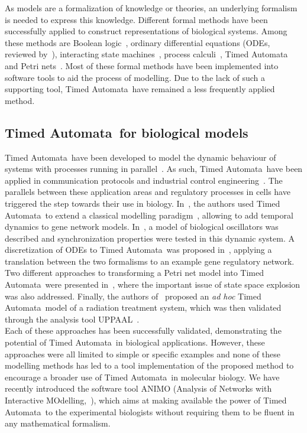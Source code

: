 \documentclass{bmcart}
\def\tas{Timed Automata}
\begin{document}
As models are a formalization of knowledge or theories, an underlying formalism is needed to express
this knowledge. Different formal methods have been successfully applied to construct representations
of biological systems. Among these methods are Boolean logic~\cite{boolean-networks,boolean-networks-flower,boolean-networks2},
ordinary differential equations (ODEs, reviewed by~\cite{hidde-review}),
interacting state machines~\cite{interacting-sm1,interacting-sm2},
process calculi~\cite{regev-shapiro,blenx,bio-pepa}, Timed Automata~\cite{ta-siebert,bartocci-oscillators,
oded-ode-ta-discretization} and Petri nets~\cite{petri-nets0,petri-nets,petri-nets2}.
Most of these formal methods have been implemented into software tools to aid the process
of modelling. Due to the lack of such a supporting tool, \tas\ have remained a less 
frequently applied method.

\subsection*{\tas\ for biological models}
\tas\ have been developed to model the dynamic behaviour of systems with processes running in parallel~\cite{timed-automata-alur-dill}. 
As such, \tas\ have been applied in communication protocols and industrial control engineering~\cite{ta-audio-protocol,ta-wap-gateway,ta-ws-bap}. The 
parallels between these application areas and regulatory processes in cells have triggered the step towards 
their use in biology.
In~\cite{ta-siebert}, the authors used \tas\ to extend a classical modelling paradigm~\cite{thomas-formalism},
allowing to add temporal dynamics to gene network models.
In~\cite{bartocci-oscillators}, a model of biological oscillators was described and synchronization properties
were tested in this dynamic system.
A discretization of ODEs to \tas\ was proposed in~\cite{oded-ode-ta-discretization}, applying
a translation between the two formalisms to an example gene regulatory network. Two 
different approaches to transforming
a Petri net model into \tas\ were presented in~\cite{ta-giapponesi},
where the important issue of state space explosion was also addressed.
Finally, the authors of~\cite{ta-radiazioni} proposed an \emph{ad hoc} \tas\ model of a radiation treatment
system, which was then validated through the analysis tool UPPAAL~\cite{uppaal}.\\
Each of these approaches has been successfully validated, demonstrating the potential of \tas\
in biological applications. However, these approaches were all limited to simple
or specific examples and none of these modelling methods
has led to a tool implementation of the proposed method to encourage a broader use
of \tas\ in molecular biology. We have recently introduced the software tool ANIMO
(Analysis of Networks with Interactive MOdelling,~\cite{animo-ieee}), which aims
at making available the power of \tas\ to the experimental biologists without requiring
them to be fluent in any mathematical formalism.
\end{document}
